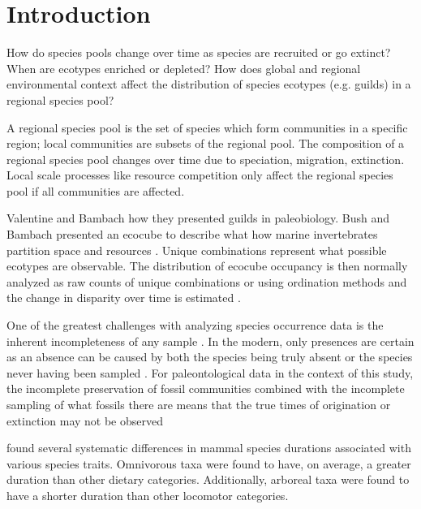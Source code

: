 \documentclass[12pt,letterpaper]{article}
\begin{document}
\section*{Introduction}


How do species pools change over time as species are recruited or go extinct? When are ecotypes enriched or depleted? How does global and regional environmental context affect the distribution of species ecotypes (e.g. guilds) in a regional species pool?

A regional species pool is the set of species which form communities in a specific region; local communities are subsets of the regional pool. The composition of a regional species pool changes over time due to speciation, migration, extinction. Local scale processes like resource competition only affect the regional species pool if all communities are affected.

Valentine and Bambach how they presented guilds in paleobiology. Bush and Bambach presented an ecocube to describe what how marine invertebrates partition space and resources \citep{Bush2007,Bambach2007,Bush2011}. Unique combinations represent what possible ecotypes are observable. The distribution of ecocube occupancy is then normally analyzed as raw counts of unique combinations or using ordination methods and the change in disparity over time is estimated \citep{Bush2007,Bambach2007,Bush2011}.


One of the greatest challenges with analyzing species occurrence data is the inherent incompleteness of any sample \citep{Royle2008,Royle2014,Foote1999a,Foote2001,Lloyd2011,Wang2016b}. In the modern, only presences are certain as an absence can be caused by both the species being truly absent or the species never having been sampled \citep{Royle2008,Royle2014}. For paleontological data in the context of this study, the incomplete preservation of fossil communities combined with the incomplete sampling of what fossils there are means that the true times of origination or extinction may not be observed \citep{Foote1999a,Foote2001,Wang2015,Wang2016b}

\citet{Smits2015b} found several systematic differences in mammal species durations associated with various species traits. Omnivorous taxa were found to have, on average, a greater duration than other dietary categories. Additionally, arboreal taxa were found to have a shorter duration than other locomotor categories. 
\end{document}
